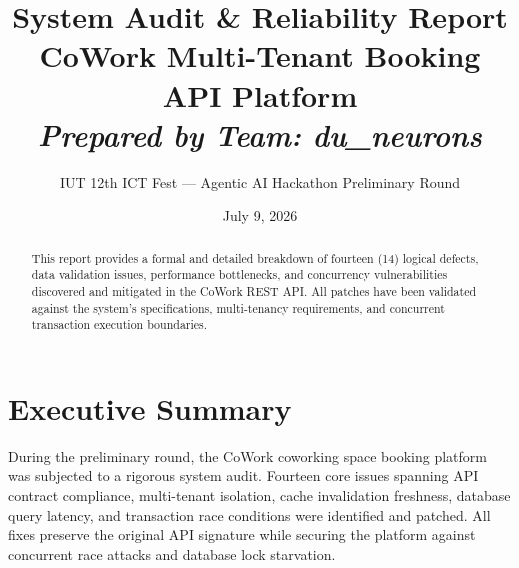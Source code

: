 \documentclass[11pt,a4paper]{article}
\title{
    \vspace{-1.5cm}
    \textbf{\Large System Audit \& Reliability Report}\\
    \large CoWork Multi-Tenant Booking API Platform\\
    \vspace{0.3cm}
    \normalsize \textit{Prepared by Team: \textbf{du\_neurons}}
}
\author{IUT 12th ICT Fest --- Agentic AI Hackathon Preliminary Round}
\date{July 9, 2026}
\begin{document}
\maketitle
\thispagestyle{fancy}

\begin{abstract}
This report provides a formal and detailed breakdown of fourteen (14) logical defects, data validation issues, performance bottlenecks, and concurrency vulnerabilities discovered and mitigated in the CoWork REST API. All patches have been validated against the system's specifications, multi-tenancy requirements, and concurrent transaction execution boundaries.
\end{abstract}

\section{Executive Summary}
During the preliminary round, the CoWork coworking space booking platform was subjected to a rigorous system audit. Fourteen core issues spanning API contract compliance, multi-tenant isolation, cache invalidation freshness, database query latency, and transaction race conditions were identified and patched. All fixes preserve the original API signature while securing the platform against concurrent race attacks and database lock starvation.
\end{document}
